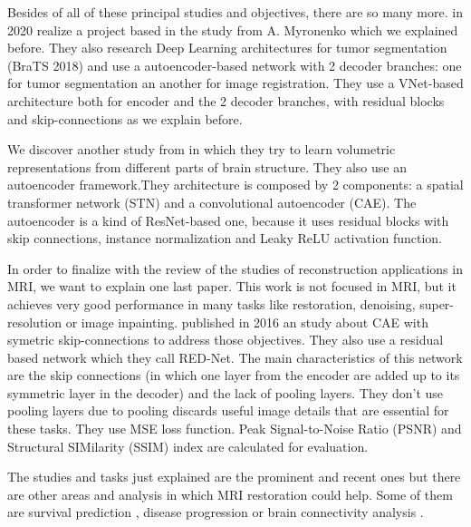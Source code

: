 

Besides of all of these principal studies and objectives, there are so many more.  \cite{otherBraTS2020} in 2020 realize a project based in the study from A. Myronenko \cite{myronenko20183d} which we explained before. They also research Deep Learning architectures for tumor segmentation (BraTS 2018) and use a autoencoder-based network with 2 decoder branches: one for tumor segmentation an another for image registration. They use a VNet-based architecture both for encoder and the 2 decoder branches, with residual blocks and skip-connections as we explain before.

We discover another study from  in which they try to learn volumetric representations from different parts of brain structure. They also use an autoencoder framework.They architecture is composed by 2 components: a spatial transformer network (STN) and a convolutional autoencoder (CAE). The autoencoder is a kind of ResNet-based one, because it uses residual blocks with skip connections, instance normalization and Leaky ReLU activation function.

In order to finalize with the review of the studies of reconstruction applications in MRI, we want to explain one last paper. This work is not focused in MRI, but it achieves very good performance in many tasks like restoration, denoising, super-resolution or image inpainting.  published in 2016 an study about CAE with symetric skip-connections to address those objectives. They also use a residual based network which they call RED-Net. The main characteristics of this network are the skip connections (in which one layer from the encoder are added up to its symmetric layer in the decoder) and the lack of pooling layers. They don't use pooling layers due to pooling discards useful image details that are essential for these tasks. They use MSE loss function. Peak Signal-to-Noise Ratio
(PSNR) and Structural SIMilarity (SSIM) index are calculated for evaluation.

The studies and tasks just explained are the prominent and recent ones but there are other areas and analysis in which MRI restoration could help. Some of them are survival prediction \cite{AnexoReviewAditional}, disease progression \cite{AnexoProgression} or brain connectivity analysis   \cite{AnexoConnectivity}.

